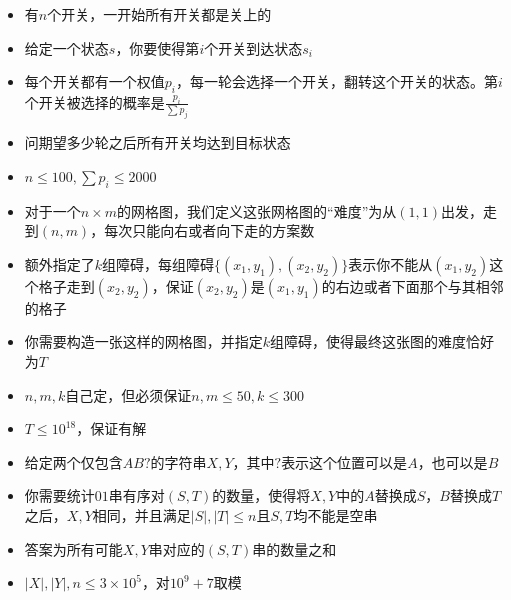 \documentclass{beamer}
\begin{document}
\begin{frame}{4}
    \begin{itemize}
        \item 有$n$个开关，一开始所有开关都是关上的
        \item 给定一个状态$s$，你要使得第$i$个开关到达状态$s_i$
        \item 每个开关都有一个权值$p_i$，每一轮会选择一个开关，翻转这个开关的状态。第$i$个开关被选择的概率是$\frac{p_i}{\sum p_j}$
        \item 问期望多少轮之后所有开关均达到目标状态
        \item $n\leq 100, \sum p_i\leq 2000$
    \end{itemize}
\end{frame}

\begin{frame}{5}
    \begin{itemize}
        \item 对于一个$n\times m$的网格图，我们定义这张网格图的“难度”为从$(1, 1)$出发，走到$(n, m)$，每次只能向右或者向下走的方案数
        \item 额外指定了$k$组障碍，每组障碍$\{(x_1, y_1),(x_2, y_2)\}$表示你不能从$(x_1, y_2)$这个格子走到$(x_2, y_2)$，保证$(x_2, y_2)$是$(x_1, y_1)$的右边或者下面那个与其相邻的格子
        \item 你需要构造一张这样的网格图，并指定$k$组障碍，使得最终这张图的难度恰好为$T$
        \item $n, m, k$自己定，但必须保证$n, m\leq 50, k\leq 300$
        \item $T\leq 10^{18}$，保证有解
    \end{itemize}
\end{frame}

\begin{frame}{6}
    \begin{itemize}
        \item 给定两个仅包含$AB?$的字符串$X, Y$，其中$?$表示这个位置可以是$A$，也可以是$B$
        \item 你需要统计$01$串有序对$(S, T)$的数量，使得将$X, Y$中的$A$替换成$S$，$B$替换成$T$之后，$X, Y$相同，并且满足$|S|, |T|\leq n$且$S, T$均不能是空串
        \item 答案为所有可能$X, Y$串对应的$(S, T)$串的数量之和
        \item $|X|, |Y|, n\leq 3\times 10^5$，对$10^9 + 7$取模
    \end{itemize}
\end{frame}
\end{document}
